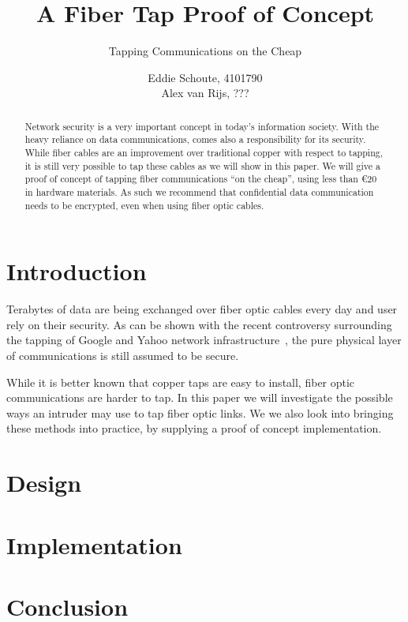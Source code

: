 \documentclass[11pt,twoside,a4paper]{scrartcl}
\title{A Fiber Tap Proof of Concept}
\subtitle{Tapping Communications on the Cheap}
\author{
		Eddie Schoute, 4101790\\
		Alex van Rijs, ???
	}
\begin{document}
\maketitle

\begin{abstract}
	\noindent Network security is a very important concept in today's information society.
	With the heavy reliance on data communications, comes also a responsibility for its security.
	While fiber cables are an improvement over traditional copper with respect to tapping,
	it is still very possible to tap these cables as we will show in this paper.
	We will give a proof of concept of tapping fiber communications ``on the cheap'',
	using less than \euro{}$20$ in hardware materials.
	As such we recommend that confidential data communication needs to be encrypted,
	even when using fiber optic cables.
\end{abstract}

\section{Introduction}
	Terabytes of data are being exchanged over fiber optic cables every day and user rely on their security.
	As can be shown with the recent controversy surrounding the tapping of Google and Yahoo network infrastructure~\cite{googleyahootap},
	the pure physical layer of communications is still assumed to be secure.

	While it is better known that copper taps are easy to install, fiber optic communications are harder to tap.
	In this paper we will investigate the possible ways an intruder may use to tap fiber optic links.
	We we also look into bringing these methods into practice, by supplying a proof of concept implementation.

\section{Design}

\section{Implementation}

\section{Conclusion}



\end{document}

